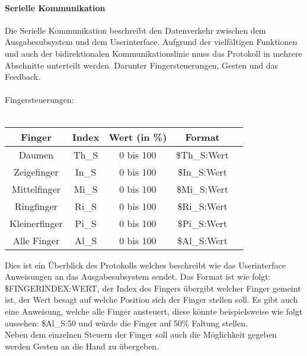 \documentclass[titlepage,12pt,twoside]{article}
\begin{document}
\paragraph{Serielle Kommunikation}
\label{par:Serielle Kommunikation}
\hfill \break
\hfill \break
Die Serielle Kommunikation beschreibt den Datenverkehr zwischen dem Ausgabesubsystem und dem Userinterface. Aufgrund der vielfältigen Funktionen und auch 
der bidirektionalen Kommunikationslinie muss das Protokoll in mehrere Abschnitte unterteilt werden. Darunter Fingersteuerungen, Gesten und das Feedback. \\
\\
Fingersteuerungen: \\
\\
\begin{table}[H]
    \centering
    \begin{tabular}{|c|c|c|c|c|}  %
        \hline
        \textbf{Finger} & \textbf{Index} & \textbf{Wert (in \%)} & \textbf{Format} \\
        \hline
		Daumen & Th\_S & 0 bis 100 & \$Th\_S:Wert \\
		\hline
		Zeigefinger & In\_S & 0 bis 100 & \$In\_S:Wert \\
		\hline
		Mittelfinger & Mi\_S & 0 bis 100 & \$Mi\_S:Wert \\
		\hline
		Ringfinger & Ri\_S & 0 bis 100 & \$Ri\_S:Wert \\
		\hline
		Kleinerfinger & Pi\_S & 0 bis 100 & \$Pi\_S:Wert \\
		\hline
		Alle Finger & Al\_S & 0 bis 100 & \$Al\_S:Wert \\
		\hline
    \end{tabular}
    \label{tab:Fingersteuerung}
\end{table}
\hfill \break
Dies ist ein Überblick des Protokolls welches beschreibt wie das Userinterface Anweisungen an das Ausgabesubsystem sendet. Das Format ist wie folgt: 
\$FINGERINDEX:WERT, der Index des Fingers übergibt welcher Finger gemeint ist, der Wert besagt auf welche Position sich der Finger stellen soll.
Es gibt auch eine Anweisung, welche alle Finger ansteuert, diese könnte beispielsweise wie folgt aussehen: \$Al\_S:50 und würde die Finger auf 50\% Faltung 
stellen. \\
Neben dem einzelnen Steuern der Finger soll auch die Möglichkeit gegeben werden Gesten an die Hand zu übergeben. \\
\\
\end{document}
